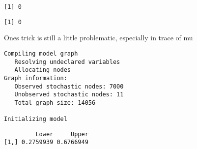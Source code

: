 \documentclass[12pt,twoside]{dukestatscithesis}
\theoremstyle{definition}
\theoremstyle{definition}
\theoremstyle{definition}
\theoremstyle{remark}
\begin{document}
\begin{verbatim}
[1] 0
\end{verbatim}
\begin{Shaded}
\begin{Highlighting}[]
\OperatorTok{$}\OperatorTok{$}\OperatorTok{$}
\end{Highlighting}
\end{Shaded}
\begin{verbatim}
[1] 0
\end{verbatim}
Ones trick is still a little problematic, especially in trace of mu
\begin{Shaded}
\begin{Highlighting}[]
\StringTok{ }\NormalTok{(}
                    \NormalTok{, }\NormalTok{(}\NormalTok{, }\NormalTok{, }\NormalTok{,}\NormalTok{,}\NormalTok{,}\NormalTok{,}\NormalTok{),}
\end{Highlighting}
\end{Shaded}
\begin{verbatim}
Compiling model graph
   Resolving undeclared variables
   Allocating nodes
Graph information:
   Observed stochastic nodes: 7000
   Unobserved stochastic nodes: 11
   Total graph size: 14056

Initializing model
\end{verbatim}
\begin{Shaded}
\begin{Highlighting}[]
\OperatorTok{$}\OperatorTok{$}\OperatorTok{$}
\end{Highlighting}
\end{Shaded}
\begin{verbatim}
         Lower     Upper
[1,] 0.2759939 0.6766949
\end{verbatim}
\end{document}
